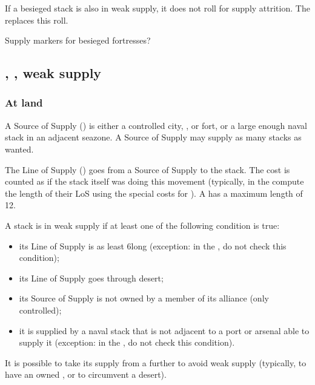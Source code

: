 If a besieged stack is also in weak supply, it does not roll for supply
attrition. The  replaces this roll.

\begin{todo}
  Supply markers for besieged fortresses?
\end{todo}

\subsection{\SoS, \LoS, weak supply}
\subsubsection{At land}
A Source of Supply (\SoS) is either a controlled city, \TP, \COL or fort, or a
large enough naval stack in an adjacent seazone. A Source of Supply may supply
as many stacks as wanted.

The Line of Supply (\LoS) goes from a Source of Supply to the stack. The \MP
cost is counted as if the stack itself was doing this movement (typically, \LD
in the \ROTW compute the length of their LoS using the special \MP costs for
\LD). A \LoS has a maximum length of 12\MP.

A stack is in weak supply if at least one of the following condition is true:
\begin{itemize}
\item its Line of Supply is as least 6\MP long (exception: in the \ROTW, \LD
  do not check this condition);
\item its Line of Supply goes through desert;
\item its Source of Supply is not owned by a member of its alliance (only
  controlled);
\item it is supplied by a naval stack that is not adjacent to a port or
  arsenal able to supply it (exception: in the \ROTW, \LD do not check this
  condition).
\end{itemize}

It is possible to take its supply from a further \SoS to avoid weak supply
(typically, to have an owned \SoS, or to circumvent a desert).


